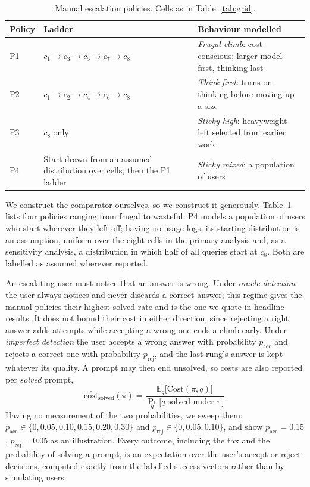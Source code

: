 \documentclass[final,5p,times,twocolumn]{elsarticle}
\theoremstyle{plain}
\newcommand{\cost}{\mathrm{cost}}
\begin{document}
\begin{table}[ht]
\centering
\caption{Manual escalation policies. Cells as in Table~\ref{tab:grid}.}
\label{tab:policies}
\begin{tabularx}{\textwidth}{@{}l p{3.4cm} >{\raggedright\arraybackslash}X@{}}
\toprule
Policy & Ladder & Behaviour modelled \\
\midrule
P1 & $c_1{\to}c_3{\to}c_5{\to}c_7{\to}c_8$ & \emph{Frugal climb}: cost-conscious; larger model first, thinking last \\
P2 & $c_1{\to}c_2{\to}c_4{\to}c_6{\to}c_8$ & \emph{Think first}: turns on thinking before moving up a size \\
P3 & $c_8$ only & \emph{Sticky high}: heavyweight left selected from earlier work \\
P4 & Start drawn from an assumed distribution over cells, then the P1 ladder & \emph{Sticky mixed}: a population of users \\
\bottomrule
\end{tabularx}
\end{table}

We construct the comparator ourselves, so we construct it generously.
Table~\ref{tab:policies} lists four policies ranging from frugal to wasteful.
P4 models a population of users who start wherever they left off; having no
usage logs, its starting distribution is an assumption, uniform over the
eight cells in the primary analysis and, as a sensitivity analysis, a
distribution in which half of all queries start at $c_8$. Both are labelled
as assumed wherever reported.

An escalating user must notice that an answer is wrong. Under \emph{oracle
detection} the user always notices and never discards a correct answer; this
regime gives the manual policies their highest solved rate and is the one we
quote in headline results. It does not bound their cost in either direction,
since rejecting a right answer adds attempts while accepting a wrong one ends
a climb early. Under \emph{imperfect detection} the user accepts a wrong
answer with probability $p_{\mathrm{acc}}$ and rejects a correct one with
probability $p_{\mathrm{rej}}$, and the last rung's answer is kept whatever
its quality. A prompt may then end unsolved, so costs are also reported per
\emph{solved} prompt,
\begin{equation}
  \bar{\cost}_{\mathrm{solved}}(\pi) =
  \frac{\mathbb{E}_q\bigl[\mathrm{Cost}(\pi, q)\bigr]}
       {\Pr_q\bigl[\text{$q$ solved under $\pi$}\bigr]}.
  \label{eq:persolved}
\end{equation}
Having no measurement of the two probabilities, we sweep them:
$p_{\mathrm{acc}} \in \{0, 0.05, 0.10, 0.15, 0.20, 0.30\}$ and
$p_{\mathrm{rej}} \in \{0, 0.05, 0.10\}$, and show
$p_{\mathrm{acc}} = 0.15$, $p_{\mathrm{rej}} = 0.05$ as an illustration.
Every outcome, including the tax and the probability of solving a prompt, is
an expectation over the user's accept-or-reject decisions, computed exactly
from the labelled success vectors rather than by simulating users.
\end{document}
